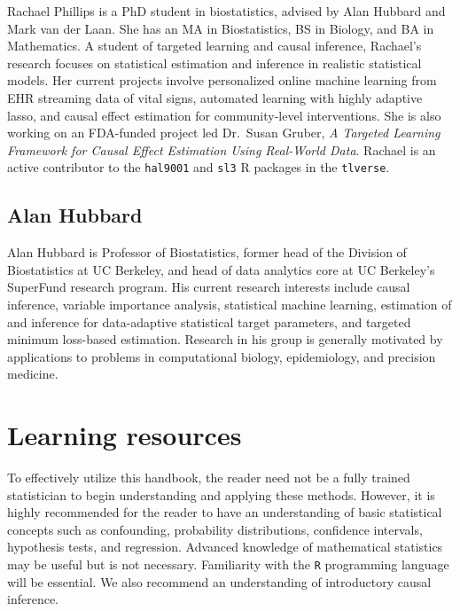 \documentclass[
  12pt, krantz2,
]{krantz}
\newcommand{\passthrough}[1]{#1}
\newcommand{\1}{\mathbbm{1}}
\theoremstyle{definition}
\theoremstyle{definition}
\theoremstyle{definition}
\theoremstyle{definition}
\theoremstyle{remark}
\begin{document}
Rachael Phillips is a PhD student in biostatistics, advised by Alan Hubbard and
Mark van der Laan. She has an MA in Biostatistics, BS in Biology, and BA in
Mathematics. A student of targeted learning and causal inference, Rachael's
research focuses on statistical estimation and inference in realistic
statistical models. Her current projects involve personalized online machine
learning from EHR streaming data of vital signs, automated learning with
highly adaptive lasso, and causal effect estimation for community-level
interventions. She is also working on an FDA-funded project led Dr.~Susan
Gruber, \emph{A Targeted Learning Framework for Causal Effect Estimation Using
Real-World Data}. Rachael is an active contributor to the \passthrough{\lstinline!hal9001!} and \passthrough{\lstinline!sl3!}
R packages in the \passthrough{\lstinline!tlverse!}.

\hypertarget{alan-hubbard}{%
\subsection*{Alan Hubbard}\label{alan-hubbard}}


Alan Hubbard is Professor of Biostatistics, former head of the Division of
Biostatistics at UC Berkeley, and head of data analytics core at UC Berkeley's
SuperFund research program. His current research interests include causal
inference, variable importance analysis, statistical machine learning,
estimation of and inference for data-adaptive statistical target parameters, and
targeted minimum loss-based estimation. Research in his group is generally
motivated by applications to problems in computational biology, epidemiology,
and precision medicine.

\hypertarget{learn}{%
\section{Learning resources}\label{learn}}

To effectively utilize this handbook, the reader need not be a fully trained
statistician to begin understanding and applying these methods. However, it is
highly recommended for the reader to have an understanding of basic statistical
concepts such as confounding, probability distributions, confidence intervals,
hypothesis tests, and regression. Advanced knowledge of mathematical statistics
may be useful but is not necessary. Familiarity with the \passthrough{\lstinline!R!} programming
language will be essential. We also recommend an understanding of introductory
causal inference.
\end{document}
